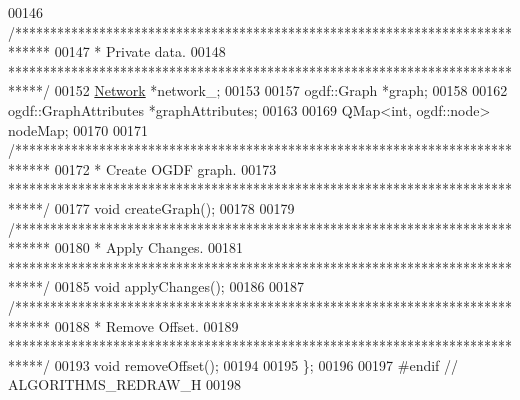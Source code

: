 \begin{DoxyCode}
00146   \textcolor{comment}{/*****************************************************************************}
00147 \textcolor{comment}{  * Private data.}
00148 \textcolor{comment}{  *****************************************************************************/}
00152   \hyperlink{class_network}{Network} *network\_;
00153 
00157   ogdf::Graph *graph;
00158 
00162   ogdf::GraphAttributes *graphAttributes;
00163 
00169   QMap<int, ogdf::node> nodeMap;
00170 
00171   \textcolor{comment}{/*****************************************************************************}
00172 \textcolor{comment}{  * Create OGDF graph.}
00173 \textcolor{comment}{  *****************************************************************************/}
00177   \textcolor{keywordtype}{void} createGraph();
00178 
00179   \textcolor{comment}{/*****************************************************************************}
00180 \textcolor{comment}{  * Apply Changes.}
00181 \textcolor{comment}{  *****************************************************************************/}
00185   \textcolor{keywordtype}{void} applyChanges();
00186 
00187   \textcolor{comment}{/*****************************************************************************}
00188 \textcolor{comment}{  * Remove Offset.}
00189 \textcolor{comment}{  *****************************************************************************/}
00193   \textcolor{keywordtype}{void} removeOffset();
00194 
00195 \};
00196 
00197 \textcolor{preprocessor}{#endif // ALGORITHMS\_REDRAW\_H}
00198 
\end{DoxyCode}
